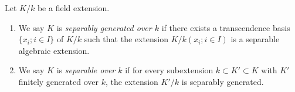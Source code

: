 \begin{definition}
\label{definition-separable-field-extension}
Let $K/k$ be a field extension.
\begin{enumerate}
\item We say $K$ is {\it separably generated over $k$} if there exists
a transcendence basis $\{x_i; i \in I\}$ of $K/k$ such that the extension
$K/k(x_i; i \in I)$ is a separable algebraic extension.
\item We say $K$ is {\it separable over $k$} if for every subextension
$k \subset K' \subset K$ with $K'$ finitely generated
over $k$, the extension $K'/k$ is separably generated.
\end{enumerate}
\end{definition}